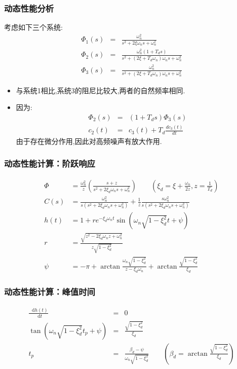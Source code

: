 \documentclass{beamer}
\newcommand*\diff{\mathop{}\!\mathrm{d}}
\begin{document}
\begin{frame}
\frametitle{动态性能分析}
\label{sec-2-3}

考虑如下三个系统:
\begin{eqnarray*}
\Phi_1(s) &=&\frac{\omega_n^2}{s^2+2\xi\omega_n s+\omega_n^2}\\
\Phi_2(s) &=&\frac{\omega_n^2(1+T_d s) }{s^2+(2\xi+T_d\omega_n)\omega_n s+\omega_n^2}\\
\Phi_3(s) &=&\frac{\omega_n^2}{s^2+(2\xi+T_d\omega_n)\omega_n s+\omega_n^2}
\end{eqnarray*}           

\begin{itemize}
\item <2->与系统1相比,系统3的阻尼比较大,两者的自然频率相同.
\item <3->因为:
        \begin{eqnarray*}
        \Phi_2(s) & = & (1+T_d s)\Phi_3(s) \\
        c_2(t) &=& c_3(t)+T_d\frac{dc_3(t)}{dt}
        \end{eqnarray*}
       由于存在微分作用,因此对高频噪声有放大作用.
\end{itemize}
\end{frame}
\begin{frame}
\frametitle{动态性能计算：阶跃响应}
\label{sec-2-4}

\begin{align*}
\Phi &=  \frac{\omega_n^2}{z}\left(\frac{s+z}{s^2+2\xi_d\omega_n s+\omega_n^2}\right)\qquad (\xi_d=\xi+\frac{\omega_n}{2z},z=\frac{1}{T_d})\\
C(s) &= \frac{\omega_n^2}{s(s^2+2\xi_d\omega_n s+\omega_n^2)}+\frac{1}{z}\frac{s\omega_n^2}{s(s^2+2\xi_d\omega_n s+\omega_n^2)}\\
h(t) &= 1+re^{-\xi_d\omega_n t}\sin(\omega_n\sqrt{1-\xi_d^2}t+\psi) \\
r &= \frac{\sqrt{z^2-2\xi_d\omega_n z+\omega_n^2}}{z\sqrt{1-\xi_d^2}}\\
\psi &= -\pi+\arctan\frac{\omega_n\sqrt{1-\xi_d^2}}{z-\xi_d\omega_n}+\arctan \frac{\sqrt{1-\xi_d^2}}{\xi_d}
\end{align*}
\end{frame}
\begin{frame}
\frametitle{动态性能计算：峰值时间}
\label{sec-2-5}


\begin{eqnarray*}
\frac{\diff h(t)}{\diff t} & =& 0\\
\tan(\omega_n\sqrt{1-\xi_d^2}t_p+\psi) &=& \frac{\sqrt{1-\xi_d^2}}{\xi_d}\\
t_p &=& \frac{\beta_d-\psi}{\omega_n\sqrt{1-\xi_d^2}}\qquad \left(\beta_d=\arctan \frac{\sqrt{1-\xi_d^2}}{\xi_d}\right)\\
\end{eqnarray*}
\end{frame}
\end{document}
